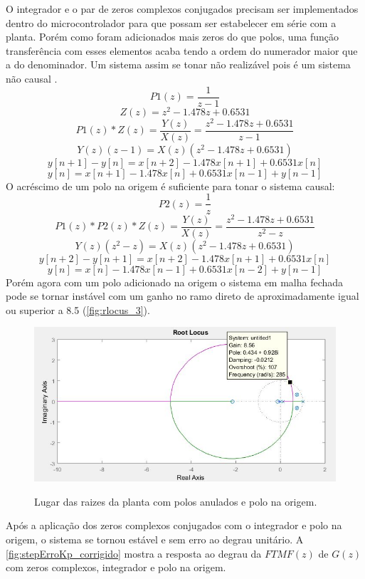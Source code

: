 \documentclass[
	article,			%
	11pt,				%
	oneside,			%
	a4paper,			%
	english,			%
	brazil,				%
	sumario=tradicional
	]{abntex2}
\begin{document}
\pagebreak

O integrador e o par de zeros complexos conjugados precisam ser implementados dentro do microcontrolador para que possam ser estabelecer em série com a planta.
Porém como foram adicionados mais zeros do que polos, uma função transferência com esses elementos acaba tendo a ordem do numerador maior que a do denominador. 
Um sistema assim se tonar não realizável pois é um sistema não causal \cite{lathi2014}. 
$$P1(z)=\frac{1}{z-1}$$
$$Z(z)=z^2 - 1.478 z + 0.6531$$
$$P1(z)*Z(z)=\frac{Y(z)}{X(z)}=\frac{z^2 - 1.478 z + 0.6531}{z-1}$$
$$Y(z)(z-1)=X(z)(z^2 - 1.478 z + 0.6531)$$
$$y[n+1]-y[n]=x[n+2] - 1.478x[n+1] + 0.6531x[n]$$
$$y[n]=x[n+1] - 1.478x[n] + 0.6531x[n-1]+y[n-1]$$
O acréscimo de um polo na origem é suficiente para tonar o sistema causal:
$$P2(z)=\frac{1}{z}$$
$$P1(z)*P2(z)*Z(z)=\frac{Y(z)}{X(z)}=\frac{z^2 - 1.478 z + 0.6531}{z^2-z}$$
$$Y(z)(z^2-z)=X(z)(z^2 - 1.478 z + 0.6531)$$
$$y[n+2]-y[n+1]=x[n+2] - 1.478x[n+1] + 0.6531x[n]$$
$$y[n]=x[n] - 1.478x[n-1] + 0.6531x[n-2]+y[n-1]$$
Porém agora com um polo adicionado na origem o sistema em malha fechada pode se tornar instável com um ganho no ramo direto de aproximadamente igual ou superior a 8.5 (\autoref{fig:rlocus_3}). 

\begin{figure}[htb!]
	\centering
	\caption{Lugar das raizes da planta com polos anulados e polo na origem.}
	\includegraphics[scale=0.8]{./img/rlocus_3.JPG}
	\label{fig:rlocus_3}
\end{figure}

\pagebreak

Após a aplicação dos zeros complexos conjugados com o integrador e polo na origem, o sistema se tornou estável e sem erro ao degrau unitário. 
A \autoref{fig:stepErroKp_corrigido} mostra a resposta ao degrau da $FTMF(z)$ de $G(z)$ com zeros complexos, integrador e polo na origem.
\end{document}
